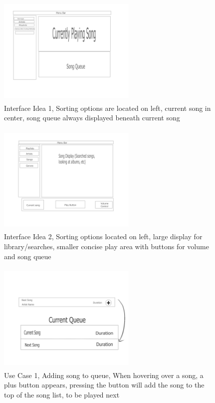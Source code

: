 \documentclass[10pt,conference,onecolumn,compsoc]{IEEEtran}
\begin{document}
\begin{figure}[ht!]
\includegraphics[height=200px, width=250px]{Interface_Mock_Up_1.jpg}
\caption{Interface Idea 1, Sorting options are located on left, current song in center, song queue always displayed beneath current song}
\label{Interface1}
\end{figure}

\begin{figure}
\includegraphics[height=200px, width=250px]{Interface_Mock_Up_2.jpg}
\caption{Interface Idea 2, Sorting options located on left, large display for library/searches, smaller concise play area with buttons for volume and song queue}
\label{Interface2}
\end{figure}

\begin{figure}[ht!]
\includegraphics[height=200px, width=250px]{Add_Song_Queue_Mock_Up.jpg}
\caption{Use Case 1, Adding song to queue, When hovering over a song, a plus button appears, pressing the button will add the song to the top of the song list, to be played next}
\label{AddSong}
\end{figure}
\end{document}
